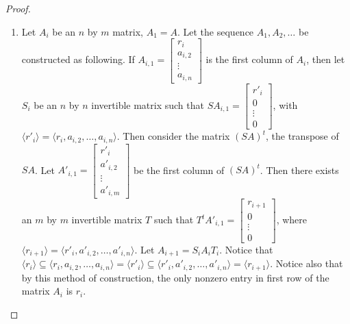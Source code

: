 \documentclass[12pt]{article}
\begin{document}
\begin{proof}
\begin{enumerate}
    \item Let $A_i$ be an $n$ by $m$ matrix, $A_1=A$. Let the sequence $A_1, A_2, \ldots$ be constructed as following. If $A_{i,1} = \begin{bmatrix} r_i \\ a_{i,2} \\ \vdots \\ a_{i, n}\end{bmatrix}$ is the first column of $A_i$, then let $S_i$ be an $n$ by $n$ invertible matrix such that $S A_{i, 1} = \begin{bmatrix} r'_i \\ 0 \\ \vdots \\ 0\end{bmatrix}$, with $\langle r'_i \rangle = \langle r_i, a_{i,2}, \ldots, a_{i,n} \rangle$. Then consider the matrix $(SA)^t$, the transpose of $SA$. Let $A'_{i,1}=\begin{bmatrix} r'_i \\ a'_{i,2} \\ \vdots \\ a'_{i, m}\end{bmatrix}$ be the first column of $(SA)^t$.  Then there exists an $m$ by $m$ invertible matrix $T$ such that $T^t A'_{i,1} = \begin{bmatrix} r_{i+1} \\ 0 \\ \vdots \\ 0\end{bmatrix}$, where $\langle r_{i+1} \rangle = \langle r'_i, a'_{i,2}, \ldots, a'_{i,n} \rangle$. Let $A_{i+1} = S_iA_iT_i$. Notice that $\langle r_i \rangle \subseteq \langle r_i, a_{i,2}, \ldots, a_{i,n} \rangle = \langle r'_i \rangle \subseteq \langle r'_i, a'_{i,2}, \ldots, a'_{i,n} \rangle = \langle r_{i+1} \rangle$. Notice also that by this method of construction, the only nonzero entry in first row of the matrix $A_i$ is $r_i$. \\


\end{enumerate}
\end{proof}
\end{document}
